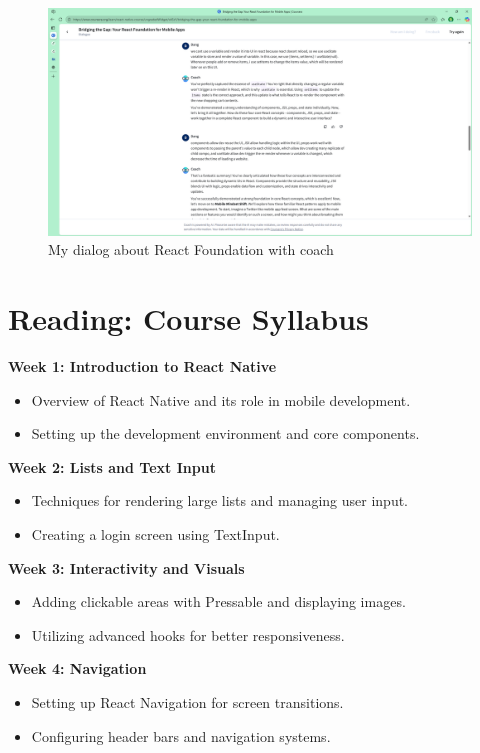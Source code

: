 \begin{center}
\begin{figure}[H]
\begin{minipage}{0.45\linewidth}
        \includegraphics[width=\textwidth]{images/4.pdf}
      \end{minipage}
      \caption{My dialog about React Foundation with coach}
    \end{figure}
\end{center}

\section{Reading: Course Syllabus}
\textbf{Week 1: Introduction to React Native  }
\begin{itemize}
    \item Overview of React Native and its role in mobile development.
    \item Setting up the development environment and core components.
\end{itemize}

\textbf{Week 2: Lists and Text Input}
\begin{itemize}
    \item Techniques for rendering large lists and managing user input.
    \item Creating a login screen using TextInput.
\end{itemize}

\textbf{Week 3: Interactivity and Visuals}
\begin{itemize}
    \item Adding clickable areas with Pressable and displaying images.
    \item Utilizing advanced hooks for better responsiveness.
\end{itemize}

\textbf{Week 4: Navigation}
\begin{itemize}
    \item Setting up React Navigation for screen transitions.
    \item Configuring header bars and navigation systems.
\end{itemize}

